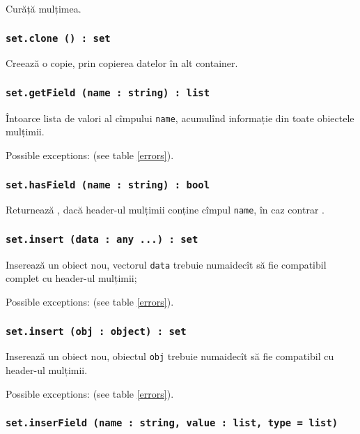 Curăță mulțimea.

\subsubsection{\texttt{set.clone () : set}}

Creează o copie, prin copierea datelor în alt container.

\subsubsection{\texttt{set.getField (name : string) : list}}

Întoarce lista de valori al cîmpului \texttt{name}, acumulînd informație din toate obiectele mulțimii.

Possible exceptions:  (see table \ref{errors}).

\subsubsection{\texttt{set.hasField (name : string) : bool}}

Returnează \true, dacă header-ul mulțimii conține cîmpul \texttt{name}, în caz contrar \false.

\subsubsection{\texttt{set.insert (data : any ...) : set}}

Inserează un obiect nou, vectorul \texttt{data} trebuie numaidecît să fie compatibil complet cu header-ul mulțimii;

Possible exceptions:  (see table \ref{errors}).

\subsubsection{\texttt{set.insert (obj : object) : set}}

Inserează un obiect nou, obiectul \texttt{obj} trebuie numaidecît să fie compatibil cu header-ul mulțimii.

Possible exceptions:  (see table \ref{errors}).

\subsubsection{\texttt{set.inserField (name : string, value : list, type = list)}}

